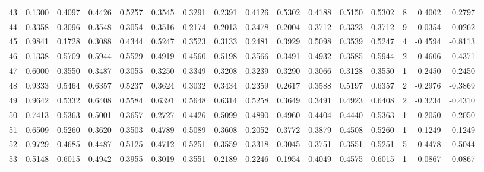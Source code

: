 \begin{tabular}{lrrrrrrrrrrrrrrr}
43  &      0.1300 &  0.4097 &  0.4426 &  0.5257 &  0.3545 &  0.3291 &  0.2391 &  0.4126 &  0.5302 &  0.4188 &   0.5150 &     0.5302 &      8 &                    0.4002 &                     0.2797 \\
44  &      0.3358 &  0.3096 &  0.3548 &  0.3054 &  0.3516 &  0.2174 &  0.2013 &  0.3478 &  0.2004 &  0.3712 &   0.3323 &     0.3712 &      9 &                    0.0354 &                    -0.0262 \\
45  &      0.9841 &  0.1728 &  0.3088 &  0.4344 &  0.5247 &  0.3523 &  0.3133 &  0.2481 &  0.3929 &  0.5098 &   0.3539 &     0.5247 &      4 &                   -0.4594 &                    -0.8113 \\
46  &      0.1338 &  0.5709 &  0.5944 &  0.5529 &  0.4919 &  0.4560 &  0.5198 &  0.3566 &  0.3491 &  0.4932 &   0.3585 &     0.5944 &      2 &                    0.4606 &                     0.4371 \\
47  &      0.6000 &  0.3550 &  0.3487 &  0.3055 &  0.3250 &  0.3349 &  0.3208 &  0.3239 &  0.3290 &  0.3066 &   0.3128 &     0.3550 &      1 &                   -0.2450 &                    -0.2450 \\
48  &      0.9333 &  0.5464 &  0.6357 &  0.5237 &  0.3624 &  0.3032 &  0.3434 &  0.2359 &  0.2617 &  0.3588 &   0.5197 &     0.6357 &      2 &                   -0.2976 &                    -0.3869 \\
49  &      0.9642 &  0.5332 &  0.6408 &  0.5584 &  0.6391 &  0.5648 &  0.6314 &  0.5258 &  0.3649 &  0.3491 &   0.4923 &     0.6408 &      2 &                   -0.3234 &                    -0.4310 \\
50  &      0.7413 &  0.5363 &  0.5001 &  0.3657 &  0.2727 &  0.4426 &  0.5099 &  0.4890 &  0.4960 &  0.4404 &   0.4440 &     0.5363 &      1 &                   -0.2050 &                    -0.2050 \\
51  &      0.6509 &  0.5260 &  0.3620 &  0.3503 &  0.4789 &  0.5089 &  0.3608 &  0.2052 &  0.3772 &  0.3879 &   0.4508 &     0.5260 &      1 &                   -0.1249 &                    -0.1249 \\
52  &      0.9729 &  0.4685 &  0.4487 &  0.5125 &  0.4712 &  0.5251 &  0.3559 &  0.3318 &  0.3045 &  0.3751 &   0.3551 &     0.5251 &      5 &                   -0.4478 &                    -0.5044 \\
53  &      0.5148 &  0.6015 &  0.4942 &  0.3955 &  0.3019 &  0.3551 &  0.2189 &  0.2246 &  0.1954 &  0.4049 &   0.4575 &     0.6015 &      1 &                    0.0867 &                     0.0867 \\

\end{tabular}

